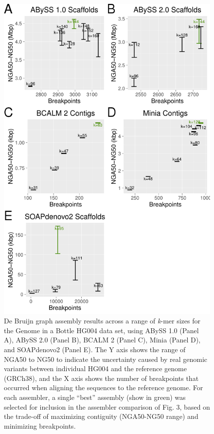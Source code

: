 \documentclass[
  12pt,
  oneside,
  openany]{book}
\begin{document}
\begin{appendices}
\begin{figure}
\hypertarget{fig:k}{%
\centering
\includegraphics{abyss2-appendix/k-sweeps.png}
\caption[De Bruijn graph assembly results across a range of \emph{k}-mer sizes for the Genome in a Bottle HG004 data set, using ABySS 1.0 (Panel A), ABySS 2.0 (Panel B), BCALM 2 (Panel C), Minia (Panel D), and SOAPdenovo2 (Panel E).]{De Bruijn graph assembly results across a range of \emph{k}-mer sizes for the Genome in a Bottle HG004 data set, using ABySS 1.0 (Panel A), ABySS 2.0 (Panel B), BCALM 2 (Panel C), Minia (Panel D), and SOAPdenovo2 (Panel E). The Y axis shows the range of NGA50 to NG50 to indicate the uncertainty caused by real genomic variants between individual HG004 and the reference genome (GRCh38), and the X axis shows the number of breakpoints that occurred when aligning the sequences to the reference genome. For each assembler, a single ``best'' assembly (show in green) was selected for inclusion in the assembler comparison of Fig. 3, based on the trade-off of maximizing contiguity (NGA50-NG50 range) and minimizing breakpoints.}\label{fig:k}
}
\end{figure}


\end{appendices}
\end{document}
